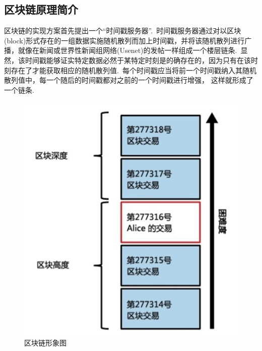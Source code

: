 \documentclass[a4paper,12pt,titlepage]{ctexart}
\begin{document}
\subsection{区块链原理简介}
区块链的实现方案首先提出一个“时间戳服务器”.~时间戳服务器通过对以区块(block)形式存在的一组数据实施随机散列而加上时间戳，并将该随机散列进行广播，就像在新闻或世界性新闻组网络(Usenet)的发帖一样组成一个楼层链条.~显然，该时间戳能够证实特定数据必然于某特定时刻是的确存在的，因为只有在该时刻存在了才能获取相应的随机散列值.~每个时间戳应当将前一个时间戳纳入其随机散列值中，每一个随后的时间戳都对之前的一个时间戳进行增强， 这样就形成了一个链条.~
\begin{figure}[!hbp]
	\centering
	\includegraphics[scale=0.6]{fig1.jpg}
    \caption{区块链形象图}
\end{figure}
\end{document}

